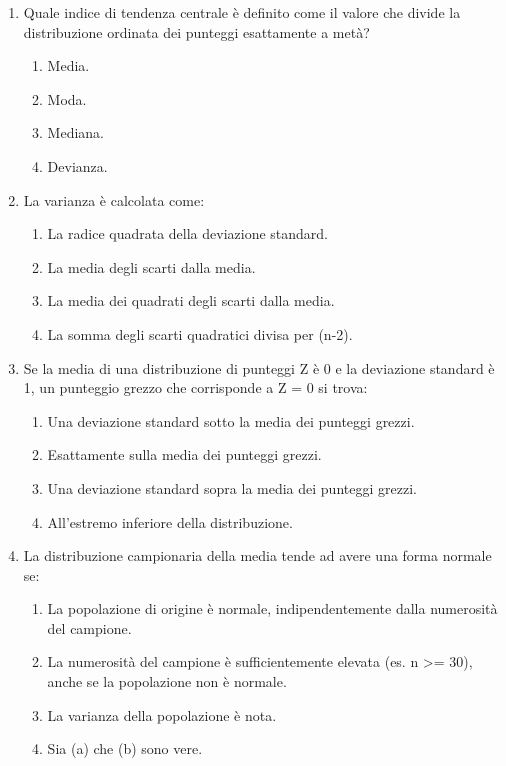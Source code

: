 \documentclass[12pt, a4paper]{article}
\begin{document}
\begin{enumerate}[resume]
    \item Quale indice di tendenza centrale è definito come il valore che divide la distribuzione ordinata dei punteggi esattamente a metà?
    \begin{enumerate}
        \item Media.
        \item Moda.
        \item Mediana.
        \item Devianza.
    \end{enumerate}
    \vspace{0.3cm}

    \item La varianza è calcolata come:
    \begin{enumerate}
        \item La radice quadrata della deviazione standard.
        \item La media degli scarti dalla media.
        \item La media dei quadrati degli scarti dalla media.
        \item La somma degli scarti quadratici divisa per (n-2).
    \end{enumerate}
    \vspace{0.3cm}

    \item Se la media di una distribuzione di punteggi Z è 0 e la deviazione standard è 1, un punteggio grezzo che corrisponde a Z = 0 si trova:
    \begin{enumerate}
        \item Una deviazione standard sotto la media dei punteggi grezzi.
        \item Esattamente sulla media dei punteggi grezzi.
        \item Una deviazione standard sopra la media dei punteggi grezzi.
        \item All'estremo inferiore della distribuzione.
    \end{enumerate}
    \vspace{0.3cm}

    \item La distribuzione campionaria della media tende ad avere una forma normale se:
    \begin{enumerate}
        \item La popolazione di origine è normale, indipendentemente dalla numerosità del campione.
        \item La numerosità del campione è sufficientemente elevata (es. n >= 30), anche se la popolazione non è normale.
        \item La varianza della popolazione è nota.
        \item Sia (a) che (b) sono vere.
    \end{enumerate}
    \vspace{0.3cm}


\end{enumerate}
\end{document}
